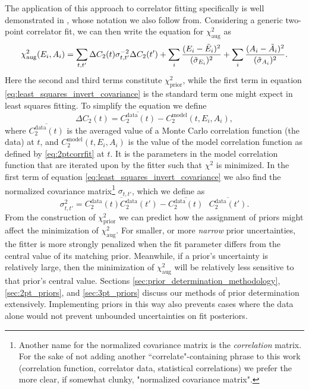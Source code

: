 The application of this approach to correlator fitting specifically is well demonstrated in \cite{bayesian}, whose notation we also follow from.  Considering a generic two-point correlator fit, we can then write the equation for $\chi^2_\mathrm{aug}$ as
\begin{equation}\label{eq:least_squares_invert_covariance}
    \chi_\mathrm{aug}^2(E_i,A_i) = \sum_{t,t'}\Delta C_2(t)\space\sigma^{-2}_{t,t'}\space\Delta C_2(t') 
    + \sum_i  \frac{(E_i - \Tilde{E}_i)^2}{(\Tilde{\sigma}_{E_i})^2} + \sum_i \frac{(A_i - \Tilde{A}_i)^2}{(\Tilde{\sigma}_{A_i})^2}.
\end{equation}
Here the second and third terms constitute $\chi^2_\mathrm{prior}$, while the first term in equation \ref{eq:least_squares_invert_covariance} is the standard term one might expect in least squares fitting.  To simplify the equation we define 
\begin{equation}\label{eq:corr_average-model}
    \Delta C_2(t) = \overline{C_2^\mathrm{data}(t)} - C_2^\mathrm{model}(t,E_i,A_i),
\end{equation}
where $\overline{C_2^\mathrm{data}(t)}$ is the averaged value of a Monte Carlo correlation function (the data) at $t$, and $C_2^\mathrm{model}(t,E_i,A_i)$ is the value of the model correlation function as defined by \ref{eq:2ptcorrfit} at $t$.  It is the parameters in the model correlation function that are iterated upon by the fitter such that $\chi^2$ is minimized. In the first term of equation \ref{eq:least_squares_invert_covariance} we also find the normalized covariance matrix\footnote{Another name for the normalized covariance matrix is the \textit{correlation} matrix.  For the sake of not adding another ``correlate"-containing phrase to this work (correlation function, correlator data, statistical correlations) we prefer the more clear, if somewhat clunky, "normalized covariance matrix".} $\sigma_{t,t'}$, which we define as 
\begin{equation}
    \sigma^2_{t,t'} = \overline{C_2^\mathrm{data}(t)C_2^\mathrm{data}(t')} -  \overline{C_2^\mathrm{data}(t)}\text{ } \overline{C_2^\mathrm{data}(t')}.
\end{equation}
From the construction of $\chi^2_\mathrm{prior}$ we can predict how the assignment of priors might affect the minimization of $\chi^2_\mathrm{aug}$.  For smaller, or more \textit{narrow} prior uncertainties, the fitter is more strongly penalized when the fit parameter differs from the central value of its matching prior.  Meanwhile, if a prior's uncertainty is relatively large, then the minimization of $\chi^2_\mathrm{aug}$ will be relatively less sensitive to that prior's central value.  Sections \ref{sec:prior_determination_methodology}, \ref{sec:2pt_priors}, and \ref{sec:3pt_priors} discuss our methods of prior determination extensively.  Implementing priors in this way also prevents cases where the data alone would not prevent unbounded uncertainties on fit posteriors.


